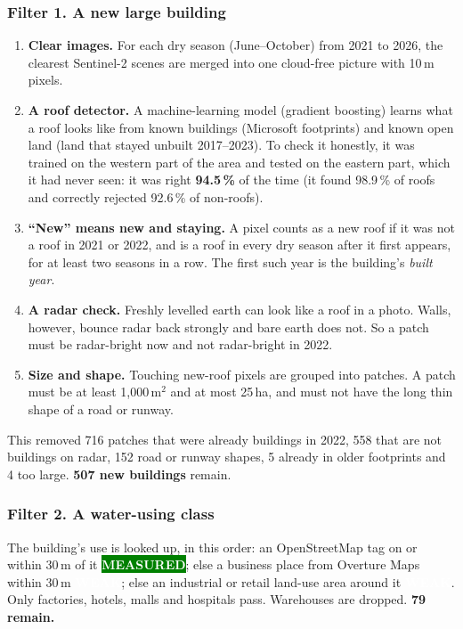 \documentclass[11pt,a4paper]{article}
\newcommand{\pv}[2]{{\setlength{\fboxsep}{1.3pt}\colorbox{#1}{\textcolor{white}{\sffamily\bfseries\fontsize{6.3}{7}\selectfont #2}}}}
\newcommand{\Mea}{\pv{green}{MEASURED}}
\newcommand{\Wk}{\pv{weak}{WEAK}}
\begin{document}
\subsubsection{Filter 1. A new large building}
\begin{enumerate}
\item \textbf{Clear images.} For each dry season (June--October) from 2021 to 2026, the clearest Sentinel-2
  scenes are merged into one cloud-free picture with 10\,m pixels.
\item \textbf{A roof detector.} A machine-learning model (gradient boosting) learns what a roof looks like
  from known buildings (Microsoft footprints) and known open land (land that stayed unbuilt 2017--2023).
  To check it honestly, it was trained on the western part of the area and tested on the eastern part,
  which it had never seen: it was right \textbf{94.5\,\%} of the time (it found 98.9\,\% of roofs and
  correctly rejected 92.6\,\% of non-roofs).
\item \textbf{``New'' means new and staying.} A pixel counts as a new roof if it was not a roof in 2021 or
  2022, and is a roof in every dry season after it first appears, for at least two seasons in a row.
  The first such year is the building's \emph{built year}.
\item \textbf{A radar check.} Freshly levelled earth can look like a roof in a photo. Walls, however, bounce
  radar back strongly and bare earth does not. So a patch must be radar-bright now and not radar-bright in
  2022.
\item \textbf{Size and shape.} Touching new-roof pixels are grouped into patches. A patch must be at least
  1,000\,m$^2$ and at most 25\,ha, and must not have the long thin shape of a road or runway.
\end{enumerate}

This removed 716 patches that were already buildings in 2022, 558 that are not buildings on radar, 152
road or runway shapes, 5 already in older footprints and 4 too large. \textbf{507 new buildings} remain.

\subsubsection{Filter 2. A water-using class}
The building's use is looked up, in this order: an OpenStreetMap tag on or within 30\,m of it \Mea; else a
business place from Overture Maps within 30\,m \Wk; else an industrial or retail land-use area around it
\Wk. Only factories, hotels, malls and hospitals pass. Warehouses are dropped. \textbf{79 remain.}
\end{document}
